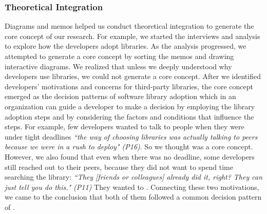 \subsubsection{Theoretical Integration} 
Diagrams and memos helped us conduct theoretical integration to generate the core concept of our research. For example, we started the interviews and analysis to explore how the developers adopt libraries. As the analysis progressed, we attempted to generate a core concept by sorting the memos and drawing interactive diagrams. We realized that unless we deeply understood why developers use libraries, we could not generate a core concept. After we identified developers' motivations and concerns for third-party libraries, the core concept emerged as the decision patterns of software library adoption which in an organization can guide a developer to make a decision by employing the library adoption steps and by considering the factors and conditions that influence the steps. 
For example, few developers wanted to talk to people when they were under tight deadlines \emph{``the way of choosing libraries was actually talking to peers because we were in a rush to deploy" (P16)}. So we thought  was a core concept. However, we also found that even when there was no deadline, some developers still reached out to their peers, because they did not want to spend time searching the library: \emph{``They [friends or colleagues] already did it, right? They can just tell you do this." (P11)} %
They wanted to . Connecting these two motivations, we came to the conclusion that both of them followed a common decision pattern of . 



